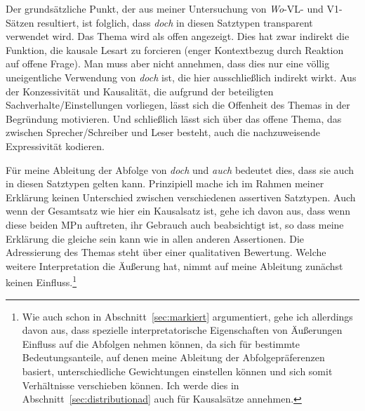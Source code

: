 Der grundsätzliche Punkt, der aus meiner Untersuchung von \textit{Wo}-VL- und V1-Sätzen resultiert, ist folglich, dass \textit{doch} in diesen Satztypen transparent verwendet wird. Das Thema wird als offen angezeigt. Dies hat zwar indirekt die Funktion, die kausale Lesart zu forcieren (enger Kontextbezug durch Reaktion auf offene Frage). Man muss aber nicht annehmen, dass dies nur eine völlig uneigentliche Verwendung von \textit{doch} ist, die hier ausschließlich indirekt wirkt. Aus der Konzessivität und Kausalität, die aufgrund der beteiligten Sachverhalte/Ein\-stellungen vorliegen, lässt sich die Offenheit des Themas in der Begründung motivieren. Und schließlich lässt sich über das offene Thema, das zwischen Sprecher/Schreiber und Leser besteht, auch die nachzuweisende Expressivität kodieren.

Für meine Ableitung der Abfolge von \textit{doch} und \textit{auch} bedeutet dies, dass sie auch in diesen Satztypen gelten kann. Prinzipiell mache ich im Rahmen meiner Erklärung keinen Unterschied zwischen verschiedenen assertiven Satztypen. Auch wenn der Gesamtsatz wie hier ein Kausalsatz ist, gehe ich davon aus, dass wenn diese beiden MPn auftreten, ihr Gebrauch auch beabsichtigt ist, so dass meine Erklärung die gleiche sein kann wie in allen anderen Assertionen. Die Adressierung des Themas steht über einer qualitativen Bewertung. Welche weitere Interpretation die Äußerung hat, nimmt auf meine Ableitung zunächst keinen Einfluss.\footnote{Wie auch schon in Abschnitt~\ref{sec:markiert} argumentiert, gehe ich allerdings davon aus, dass spezielle interpretatorische Eigenschaften von Äußerungen Einfluss auf die Abfolgen nehmen können, da sich für bestimmte Bedeutungsanteile, auf denen meine Ableitung der Abfolgepräferenzen basiert, unterschiedliche Gewichtungen einstellen können und sich somit Verhältnisse verschieben können. Ich werde dies in Abschnitt~\ref{sec:distributionad} auch für Kausalsätze annehmen.}

